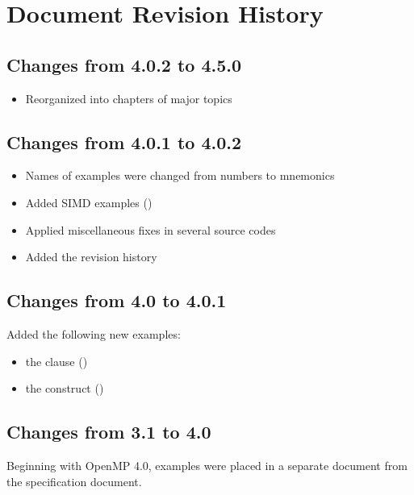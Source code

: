 \chapter{Document Revision History}
\label{chap:history}

\section{Changes from 4.0.2 to 4.5.0}
\begin{itemize}
\item Reorganized into chapters of major topics
\end{itemize}

\section{Changes from 4.0.1 to 4.0.2}

\begin{itemize}
\item Names of examples were changed from numbers to mnemonics
\item Added SIMD examples ()
\item Applied miscellaneous fixes in several source codes
\item Added the revision history
\end{itemize}

\section{Changes from 4.0 to 4.0.1}

Added the following new examples:
\begin{itemize}
\item the  clause ()
\item the  construct ()
\end{itemize}

\section{Changes from 3.1 to 4.0}

Beginning with OpenMP 4.0, examples were placed in a separate document
from the specification document.

